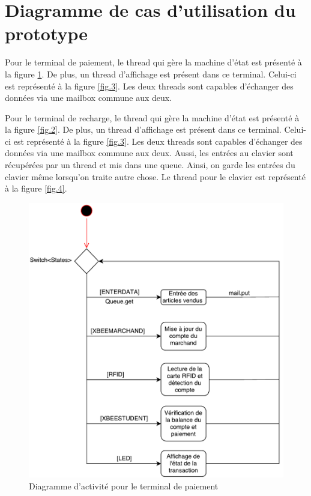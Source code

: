\section{Diagramme de cas d'utilisation du prototype}

Pour le terminal de paiement, le thread qui gère la machine d'état est présenté à la figure \ref{fig.1}. De plus, un thread d'affichage est présent dans ce terminal. Celui-ci est représenté à la figure \ref{fig.3}. Les deux threads sont capables d'échanger des données via une mailbox commune aux deux. 

Pour le terminal de recharge, le thread qui gère la machine d'état est présenté à la figure \ref{fig.2}. De plus, un thread d'affichage est présent dans ce terminal. Celui-ci est représenté à la figure \ref{fig.3}. Les deux threads sont capables d'échanger des données via une mailbox commune aux deux. Aussi, les entrées au clavier sont récupérées par un thread et mis dans une queue. Ainsi, on garde les entrées du clavier même lorsqu'on traite autre chose. Le thread pour le clavier est représenté à la figure \ref{fig.4}.

\begin{figure}[hp]
	\centering
		\includegraphics[width=\textwidth]{Pictures/UML_paiement.pdf}
		\caption{Diagramme d'activité pour le terminal de paiement}
		\label{fig.1}
\end{figure}


